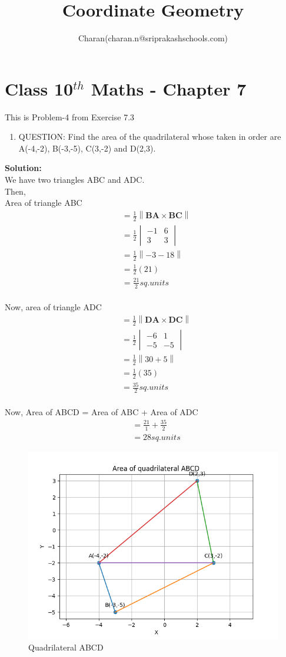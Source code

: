 \documentclass[10pt]{article}
\title{Coordinate Geometry}
\author{Charan(charan.n@sriprakashschools.com)}
\newcommand{\mydet}[1]{\ensuremath{\begin{vmatrix}#1\end{vmatrix}}}
\newcommand{\solution}{\noindent \textbf{Solution: }}
\providecommand{\norm}[1]{\left\lVert#1\right\rVert}
\let\vec\mathbf
\begin{document}
\maketitle
\section{Class 10$^{th}$ Maths - Chapter 7}
This is Problem-4 from Exercise 7.3
\begin{enumerate}
\item  QUESTION: Find the area of the quadrilateral whose taken in order are A(-4,-2), B(-3,-5), C(3,-2) and D(2,3).
\end{enumerate}
\solution \\We have two triangles ABC and ADC.\\
Then, \\Area of triangle ABC
\begin{align}
&=\frac{1}{2}\norm{{\vec{BA}\times \vec{BC}}}\\
&=\frac{1}{2}\mydet{ {-1}&{6}\\{3}&{3}}\\ 
&=\frac{1}{2}\norm{-3-18}\\
&=\frac{1}{2}(21)\\
&=\frac{21}{2} sq.units
\end{align}
\\Now, area of triangle ADC
\begin{align}
&=\frac{1}{2}\norm{{\vec{DA}\times \vec{DC}}}\\
&=\frac{1}{2}\mydet{ {-6}&{1}\\{-5}&{-5}}\\ 
&=\frac{1}{2}\norm{30+5}\\
&=\frac{1}{2}(35)\\
&=\frac{35}{2} sq.units
\end{align}
\\Now, Area of ABCD = Area of ABC + Area of ADC
\begin{align}
    &=\frac{21}{1}+ \frac{35}{2}\\
 &=28 sq.units
\end{align}

\begin{figure}[H]
			\centering
			\includegraphics[width=\columnwidth]{figs/Figure_1.png}
			\caption{Quadrilateral ABCD}
			\label{fig:quad1}
		\end{figure}
\end{document}
